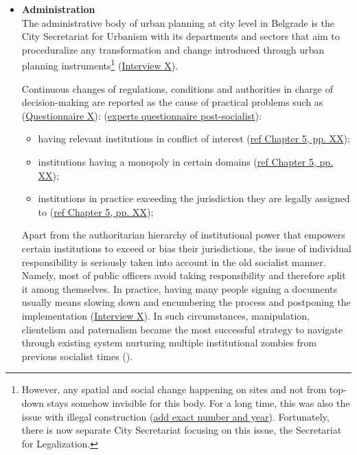 \documentclass[11pt]{report}
\begin{document}
\begin{itemize}
\item \textbf{Administration}
\\
The administrative body of urban planning at city level in Belgrade is the City Secretariat for Urbanism with its departments and sectors that aim to proceduralize any transformation and change introduced through urban planning instruments\footnote{However, any spatial and social change happening on sites and not from top-down stays somehow invisible for this body. For a long time, this was also the issue with illegal construction (\href{ref}{add exact number and year}). Fortunately, there is now separate City Secretariat focusing on this issue, the Secretariat for Legalization.}
(\href{InterviewX}{Interview X}).

Continuous changes of regulations, conditions and authorities in charge of decision-making are reported as the cause of practical problems such as (\href{Questionnaire Experts Post-socialist}{Questionnaire X}):
(\href{ref}{experts questionnaire post-socialist}):

\begin{itemize}
\item having relevant institutions in conflict of interest (\href{ref}{ref Chapter 5, pp. XX}); 
\item institutions having a monopoly in certain domains (\href{ref}{ref Chapter 5, pp. XX});
\item institutions in practice exceeding the jurisdiction they are legally assigned to (\href{ref}{ref Chapter 5, pp. XX});
\end{itemize}

Apart from the authoritarian hierarchy of institutional power that empowers certain institutions to exceed or bias their jurisdictions, the issue of individual responsibility is seriously taken into account in the old socialist manner. Namely, most of public officers avoid taking responsibility and therefore split it among themselves.
In practice, having many people signing a documents usually means slowing down and encumbering the process and postponing the implementation
(\href{InterviewX}{Interview X}).
In such circumstances, manipulation, clientelism and paternalism became the most successful strategy to navigate through existing system nurturing multiple institutional zombies from previous socialist times (\href{ref}{\citealt{vujosevic_collapse_2010}}). 
\\


\end{itemize}
\end{document}
